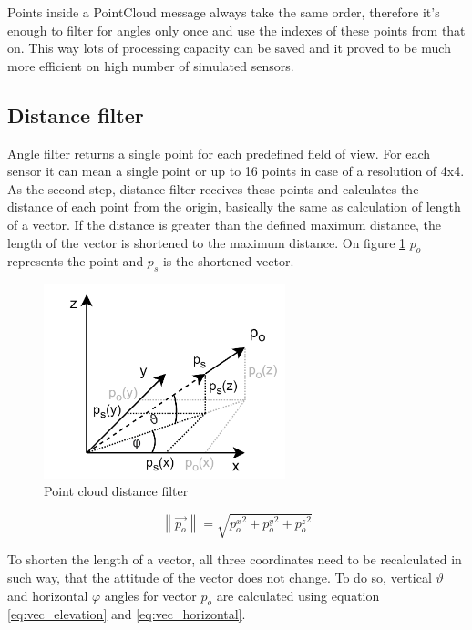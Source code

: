 Points inside a PointCloud message always take the same order, therefore it's enough to filter 
for angles only once and use the indexes of these points from that on. This way lots of processing capacity
can be saved and it proved to be much more efficient on high number of simulated sensors.


\subsection{Distance filter}
Angle filter returns a single point for each predefined field of view. For each sensor it can mean a single 
point or up to 16 points in case of a resolution of 4x4. As the second step, distance filter receives these 
points and calculates the distance of each point from the origin, basically the same as calculation of length
of a vector. If the distance is greater than the defined maximum distance, the length of the vector
is shortened to the maximum distance. On figure \ref{fig:data_distance_filter} $p_{o}$ represents the 
point and $p_{s}$ is the shortened vector.

\begin{figure}[!ht]
    \centering
    \includegraphics[width=70mm, keepaspectratio]{figures/data_distance_filter.png}
    \caption{Point cloud distance filter}
    \label{fig:data_distance_filter}
\end{figure}

\begin{equation} \label{eq:point_length}
    \left\|\vec{p_{o}}\right\| = \sqrt{{p_{o}^{x}}^{2}+{p_{o}^{y}}^{2}+{p_{o}^{z}}^{2}}
\end{equation}

To shorten the length of a vector, all three coordinates need to be recalculated in such way, that the attitude of
the vector does not change. To do so, vertical $\vartheta$ and horizontal $\varphi$ angles for vector $p_{o}$
are calculated using equation \ref{eq:vec_elevation} and \ref{eq:vec_horizontal}.

